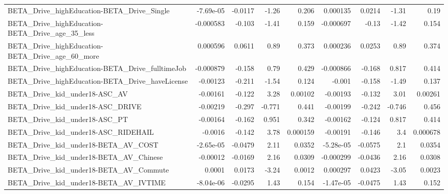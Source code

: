 \begin{tabular}{lrrrrrrrr}
BETA\_Drive\_highEducation-BETA\_Drive\_Single         &   -7.69e-05 &      -0.0117 &     -1.26 &    0.206 &   0.000135 &      0.0214 &        -1.31 &          0.19 \\
BETA\_Drive\_highEducation-BETA\_Drive\_age\_35\_less    &   -0.000583 &       -0.103 &     -1.41 &    0.159 &  -0.000697 &       -0.13 &        -1.42 &         0.154 \\
BETA\_Drive\_highEducation-BETA\_Drive\_age\_60\_more    &    0.000596 &       0.0611 &      0.89 &    0.373 &   0.000236 &      0.0253 &         0.89 &         0.374 \\
BETA\_Drive\_highEducation-BETA\_Drive\_fulltimeJob    &   -0.000879 &       -0.158 &      0.79 &    0.429 &  -0.000866 &      -0.168 &        0.817 &         0.414 \\
BETA\_Drive\_highEducation-BETA\_Drive\_haveLicense    &    -0.00123 &       -0.211 &     -1.54 &    0.124 &     -0.001 &      -0.158 &        -1.49 &         0.137 \\
BETA\_Drive\_kid\_under18-ASC\_AV                      &    -0.00161 &       -0.122 &      3.28 &  0.00102 &   -0.00193 &      -0.132 &         3.01 &       0.00261 \\
BETA\_Drive\_kid\_under18-ASC\_DRIVE                   &    -0.00219 &       -0.297 &    -0.771 &    0.441 &   -0.00199 &      -0.242 &       -0.746 &         0.456 \\
BETA\_Drive\_kid\_under18-ASC\_PT                      &    -0.00164 &       -0.162 &     0.951 &    0.342 &   -0.00162 &      -0.124 &        0.817 &         0.414 \\
BETA\_Drive\_kid\_under18-ASC\_RIDEHAIL                &     -0.0016 &       -0.142 &      3.78 & 0.000159 &   -0.00191 &      -0.146 &          3.4 &      0.000678 \\
BETA\_Drive\_kid\_under18-BETA\_AV\_COST                &   -2.65e-05 &      -0.0479 &      2.11 &   0.0352 &  -5.28e-05 &     -0.0575 &          2.1 &        0.0354 \\
BETA\_Drive\_kid\_under18-BETA\_AV\_Chinese             &    -0.00012 &      -0.0169 &      2.16 &   0.0309 &  -0.000299 &     -0.0436 &         2.16 &        0.0308 \\
BETA\_Drive\_kid\_under18-BETA\_AV\_Commute             &      0.0001 &       0.0173 &     -3.24 &   0.0012 &   0.000297 &      0.0423 &        -3.05 &        0.0023 \\
BETA\_Drive\_kid\_under18-BETA\_AV\_IVTIME              &   -8.04e-06 &      -0.0295 &      1.43 &    0.154 &  -1.47e-05 &     -0.0475 &         1.43 &         0.152 \\

\end{tabular}
